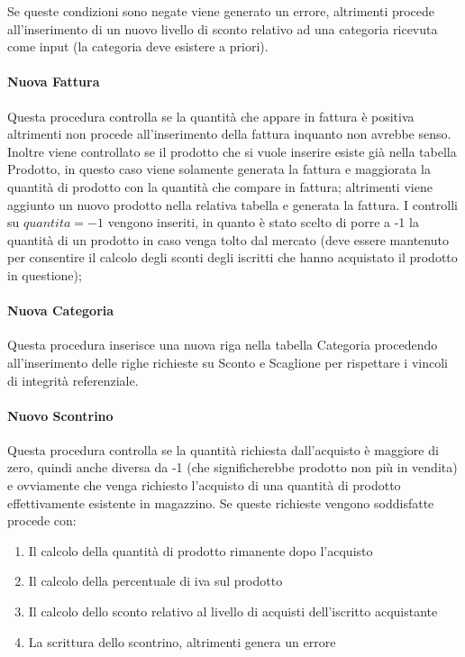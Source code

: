 Se queste condizioni sono negate viene generato un errore, altrimenti procede all'inserimento di un nuovo livello di sconto relativo ad una categoria ricevuta come input (la categoria deve esistere a priori). \newpage



\paragraph*{Nuova Fattura}
Questa procedura controlla se la quantit\`a che appare in fattura \`e positiva altrimenti non procede all'inserimento della fattura inquanto non avrebbe senso. Inoltre viene controllato se il prodotto che si vuole inserire esiste gi\`a nella tabella Prodotto, in questo caso viene solamente generata la fattura e maggiorata la quantit\`a di prodotto con la quantit\`a che compare in fattura; altrimenti viene aggiunto un nuovo prodotto nella relativa tabella e generata la fattura. 
I controlli su $quantita = -1$ vengono inseriti, in quanto \`e stato scelto di porre a -1 la quantit\`a di un prodotto in caso venga tolto dal mercato (deve essere mantenuto per consentire il calcolo degli sconti degli iscritti che hanno acquistato il prodotto in questione);



\paragraph*{Nuova Categoria}
Questa procedura inserisce una nuova riga nella tabella Categoria procedendo all'inserimento delle righe richieste su Sconto e Scaglione per rispettare i vincoli di integrit\`a referenziale.



\paragraph*{Nuovo Scontrino}
Questa procedura controlla se la quantit\`a richiesta dall'acquisto \`e maggiore di zero, quindi anche diversa da -1 (che significherebbe prodotto non pi\`u in vendita) e ovviamente che venga richiesto l'acquisto di una quantit\`a di prodotto effettivamente esistente in magazzino. Se queste richieste vengono soddisfatte procede con:
\begin{enumerate}

\item Il calcolo della quantit\`a di prodotto rimanente dopo l'acquisto

\item Il calcolo della percentuale di iva sul prodotto

\item Il calcolo dello sconto relativo al livello di acquisti dell'iscritto acquistante

\item La scrittura dello scontrino, altrimenti genera un errore

\end{enumerate}

